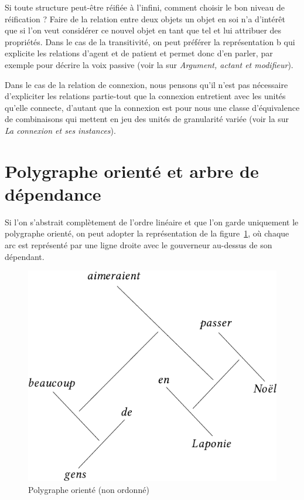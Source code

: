 {    Si toute structure peut-être réifiée à l’infini, comment choisir le bon niveau de réification ? Faire de la relation entre deux objets un objet en soi n’a d’intérêt que si l’on veut considérer ce nouvel objet en tant que tel et lui attribuer des propriétés. Dans le cas de la transitivité, on peut préférer la représentation b qui explicite les relations d’agent et de patient et permet donc d’en parler, par exemple pour décrire la voix passive (voir la  sur \textit{Argument, actant et modifieur}).

    Dans le cas de la relation de connexion, nous pensons qu’il n’est pas nécessaire d’expliciter les relations partie-tout que la connexion entretient avec les unités qu’elle connecte, d'autant que la connexion est pour nous une classe d'équivalence de combinaisons qui mettent en jeu des unités de granularité variée (voir la  sur \textit{La connexion et ses instances}).}

\section{Polygraphe orienté et arbre de dépendance}\label{sec:3.4.23}

Si l’on s’abstrait complètement de l’ordre linéaire et que l’on garde uniquement le polygraphe orienté, on peut adopter la représentation de la figure~\ref{fig:laponie-polygraphe-pur}, où chaque arc est représenté par une ligne droite avec le gouverneur au-dessus de son dépendant.

\begin{figure}
\caption{\label{fig:laponie-polygraphe-pur}Polygraphe orienté (non ordonné)}
\includegraphics[scale=0.9]{figures/polygraphs/poly-3.4.23-1.pdf}
\end{figure}

